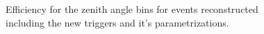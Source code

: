\documentclass[12pt,a4paper]{article}
\begin{document}
\begin{figure}[p]
    \begin{center}
        \caption{Efficiency for the zenith angle bins for events reconstructed including the new triggers and it's parametrizations.
        \label{fig:zenithNew}}
    \end{center}
\end{figure}


\end{document}
